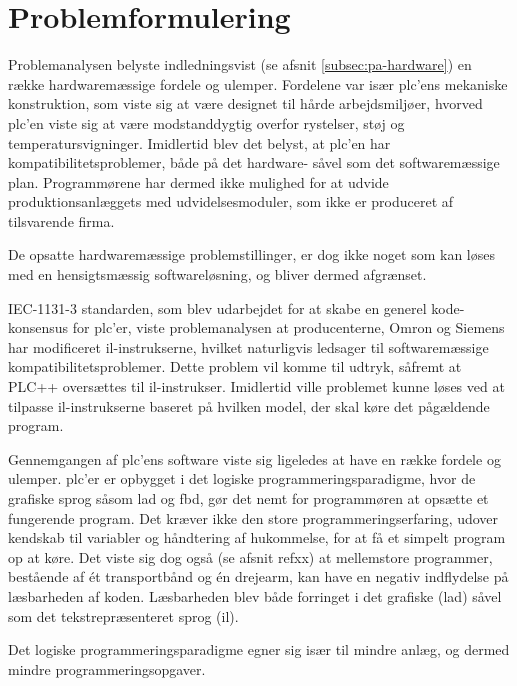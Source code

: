 \section{Problemformulering}
Problemanalysen belyste indledningsvist (se afsnit \ref{subsec:pa-hardware}) en række hardwaremæssige fordele og ulemper. Fordelene var især \gls{plc}'ens mekaniske konstruktion, som viste sig at være designet til hårde arbejdsmiljøer, hvorved \gls{plc}'en viste sig at være modstanddygtig overfor rystelser, støj og temperatursvigninger. Imidlertid blev det belyst, at \gls{plc}'en har kompatibilitetsproblemer, både på det hardware- såvel som det softwaremæssige plan. Programmørene har dermed ikke mulighed for at udvide produktionsanlæggets med udvidelsesmoduler, som ikke er produceret af tilsvarende firma.

De opsatte hardwaremæssige problemstillinger, er dog ikke noget som kan løses med en hensigtsmæssig softwareløsning, og bliver dermed afgrænset. 

IEC-1131-3 standarden, som blev udarbejdet for at skabe en generel kode-konsensus for \gls{plc}'er, viste problemanalysen at producenterne, Omron og Siemens har modificeret \gls{il}-instrukserne, hvilket naturligvis ledsager til softwaremæssige kompatibilitetsproblemer. Dette problem vil komme til udtryk, såfremt at PLC++ oversættes til \gls{il}-instrukser. Imidlertid ville problemet kunne løses ved at tilpasse \gls{il}-instrukserne baseret på hvilken model, der skal køre det pågældende program.

Gennemgangen af \gls{plc}'ens software viste sig ligeledes at have en række fordele og ulemper. \gls{plc}'er er opbygget i det logiske programmeringsparadigme, hvor de grafiske sprog såsom \gls{lad} og \gls{fbd}, gør det nemt for programmøren at opsætte et fungerende program. Det kræver ikke den store programmeringserfaring, udover kendskab til variabler og håndtering af hukommelse, for at få et simpelt program op at køre. Det viste sig dog også (se afsnit refxx) at mellemstore programmer, bestående af ét transportbånd og én drejearm, kan have en negativ indflydelse på læsbarheden af koden. Læsbarheden blev både forringet i det grafiske (\gls{lad}) såvel som det tekstrepræsenteret sprog (\gls{il}). 

\noindent Det logiske programmeringsparadigme egner sig især til mindre anlæg, og dermed mindre programmeringsopgaver.







